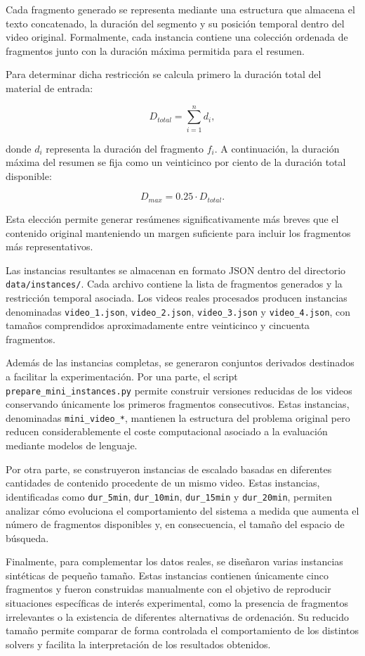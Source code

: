 \documentclass[12pt,a4paper]{article}
\begin{document}
Cada fragmento generado se representa mediante una estructura que almacena el texto concatenado, la duración del segmento y su posición temporal dentro del video original. Formalmente, cada instancia contiene una colección ordenada de fragmentos junto con la duración máxima permitida para el resumen.

Para determinar dicha restricción se calcula primero la duración total del material de entrada:

\[
D_{total}
=
\sum_{i=1}^{n} d_i,
\]

donde \(d_i\) representa la duración del fragmento \(f_i\). A continuación, la duración máxima del resumen se fija como un veinticinco por ciento de la duración total disponible:

\[
D_{max}
=
0.25 \cdot D_{total}.
\]

Esta elección permite generar resúmenes significativamente más breves que el contenido original manteniendo un margen suficiente para incluir los fragmentos más representativos.

Las instancias resultantes se almacenan en formato JSON dentro del directorio \texttt{data/instances/}. Cada archivo contiene la lista de fragmentos generados y la restricción temporal asociada. Los videos reales procesados producen instancias denominadas \texttt{video\_1.json}, \texttt{video\_2.json}, \texttt{video\_3.json} y \texttt{video\_4.json}, con tamaños comprendidos aproximadamente entre veinticinco y cincuenta fragmentos.

Además de las instancias completas, se generaron conjuntos derivados destinados a facilitar la experimentación. Por una parte, el script \texttt{prepare\_mini\_instances.py} permite construir versiones reducidas de los videos conservando únicamente los primeros fragmentos consecutivos. Estas instancias, denominadas \texttt{mini\_video\_*}, mantienen la estructura del problema original pero reducen considerablemente el coste computacional asociado a la evaluación mediante modelos de lenguaje.

Por otra parte, se construyeron instancias de escalado basadas en diferentes cantidades de contenido procedente de un mismo video. Estas instancias, identificadas como \texttt{dur\_5min}, \texttt{dur\_10min}, \texttt{dur\_15min} y \texttt{dur\_20min}, permiten analizar cómo evoluciona el comportamiento del sistema a medida que aumenta el número de fragmentos disponibles y, en consecuencia, el tamaño del espacio de búsqueda.

Finalmente, para complementar los datos reales, se diseñaron varias instancias sintéticas de pequeño tamaño. Estas instancias contienen únicamente cinco fragmentos y fueron construidas manualmente con el objetivo de reproducir situaciones específicas de interés experimental, como la presencia de fragmentos irrelevantes o la existencia de diferentes alternativas de ordenación. Su reducido tamaño permite comparar de forma controlada el comportamiento de los distintos solvers y facilita la interpretación de los resultados obtenidos.
\end{document}
